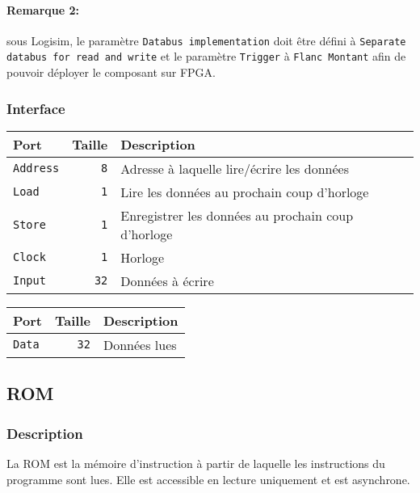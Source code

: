 \paragraph{Remarque 2:} sous Logisim, le paramètre \texttt{Databus implementation} doit être défini à \texttt{Separate databus for read and write} 
et le paramètre \texttt{Trigger} à \texttt{Flanc Montant} afin de pouvoir déployer le composant sur FPGA.

\subsubsection{Interface}


\begin{tabular}{|l|r|l|}
\hline
\textbf{Port}		& \textbf{Taille} & \textbf{Description}\\
\hline

\texttt{Address}	&  \texttt{8} & Adresse à laquelle lire/écrire les données\\
\hline
\texttt{Load}		&  \texttt{1} & Lire les données au prochain coup d'horloge\\
\hline
\texttt{Store}		&  \texttt{1} & Enregistrer les données au prochain coup d'horloge\\
\hline
\texttt{Clock}		&  \texttt{1} & Horloge\\
\hline
\texttt{Input}		&  \texttt{32} & Données à écrire\\


\hline
\end{tabular}


\begin{tabular}{|l|r|l|}
\hline 
\textbf{Port} & \textbf{Taille} & \textbf{Description}\\
\hline
\texttt{Data}		& \texttt{32} & Données lues\\

\hline
\end{tabular}


\subsection{ROM}

\subsubsection{Description}

La ROM est la mémoire d'instruction à partir de laquelle les instructions du programme sont lues. Elle est accessible en lecture uniquement et est asynchrone.

